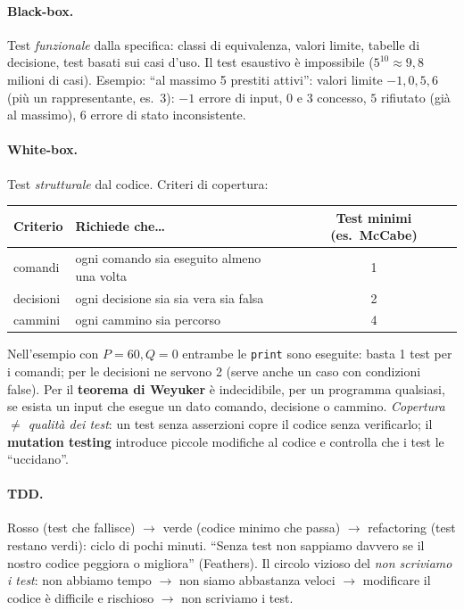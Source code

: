 \documentclass[a4paper,12pt]{article}
\begin{document}
\paragraph{Black-box.} Test \emph{funzionale} dalla specifica: classi di equivalenza, valori
limite, tabelle di decisione, test basati sui casi d'uso. Il test esaustivo è impossibile
($5^{10}\approx 9{,}8$ milioni di casi). Esempio: ``al massimo 5 prestiti attivi'': valori
limite $-1,0,5,6$ (più un rappresentante, es.\ 3): $-1$ errore di input, $0$ e $3$ concesso,
$5$ rifiutato (già al massimo), $6$ errore di stato inconsistente.

\paragraph{White-box.} Test \emph{strutturale} dal codice. Criteri di copertura:
\begin{center}
\begin{tabular}{|l|p{7cm}|c|}
\hline
\textbf{Criterio} & \textbf{Richiede che\dots} & \textbf{Test minimi (es.\ McCabe)}\\
\hline
comandi & ogni comando sia eseguito almeno una volta & 1\\
decisioni & ogni decisione sia sia vera sia falsa & 2\\
cammini & ogni cammino sia percorso & 4\\
\hline
\end{tabular}
\end{center}
Nell'esempio con $P=60,Q=0$ entrambe le \texttt{print} sono eseguite: basta 1 test per i
comandi; per le decisioni ne servono 2 (serve anche un caso con condizioni false). Per il
\textbf{teorema di Weyuker} è indecidibile, per un programma qualsiasi, se esista un input
che esegue un dato comando, decisione o cammino. \emph{Copertura $\neq$ qualità dei test}:
un test senza asserzioni copre il codice senza verificarlo; il \textbf{mutation testing}
introduce piccole modifiche al codice e controlla che i test le ``uccidano''.

\paragraph{TDD.} Rosso (test che fallisce) $\to$ verde (codice minimo che passa) $\to$
refactoring (test restano verdi): ciclo di pochi minuti. ``Senza test non sappiamo davvero se
il nostro codice peggiora o migliora'' (Feathers). Il circolo vizioso del \emph{non
scriviamo i test}: non abbiamo tempo $\to$ non siamo abbastanza veloci $\to$ modificare il
codice è difficile e rischioso $\to$ non scriviamo i test.
\end{document}
